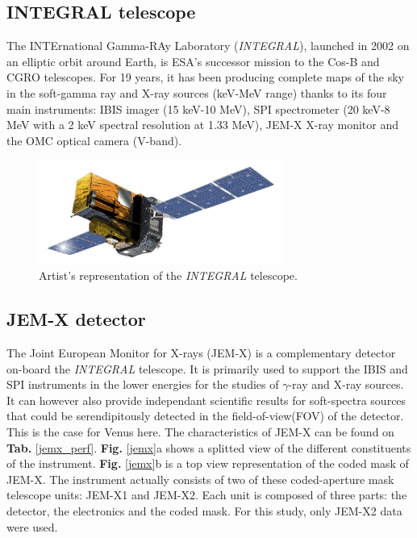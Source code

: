 \subsection{INTEGRAL telescope}
The INTErnational Gamma-RAy Laboratory (\textit{INTEGRAL}), launched in 2002 on an elliptic orbit around Earth, is ESA's successor mission to the Cos-B and CGRO telescopes. For 19 years, it has been producing complete maps of the sky in the soft-gamma ray and X-ray sources (keV-MeV range) thanks to its four main instruments: IBIS imager (15 keV-10 MeV), SPI spectrometer (20 keV-8 MeV with a 2 keV spectral resolution at 1.33 MeV), JEM-X X-ray monitor and the OMC optical camera (V-band)\cite{integraal}.
    
    \begin{figure}[H]
        \centering
        \includegraphics[width = 8cm]{report/Figures/intro/INTEGRAL_spacecraft_model.png}
        \caption{Artist's representation of the \textit{INTEGRAL} telescope.}
        \label{integral}
    \end{figure}
    
        \subsection{JEM-X detector}
        The Joint European Monitor for X-rays (JEM-X) is a complementary detector on-board the \textit{INTEGRAL} telescope. It is primarily used to support the IBIS and SPI instruments in the lower energies for the studies of $\gamma$-ray and X-ray sources. It can however also provide independant scientific results for soft-spectra sources that could be serendipitously detected in the field-of-view(FOV) of the detector. This is the case for Venus here\cite{2020ISDCManual}.
        The characteristics of JEM-X can be found on \textbf{Tab.} \ref{jemx_perf}. \textbf{Fig.} \ref{jemx}a shows a splitted view of the different constituents of the instrument. \textbf{Fig.} \ref{jemx}b is a top view representation of the coded mask of JEM-X. The instrument actually consists of two of these coded-aperture mask telescope units: JEM-X1 and JEM-X2. Each unit is composed of three parts: the detector, the electronics and the coded mask. For this study, only JEM-X2 data were used.

